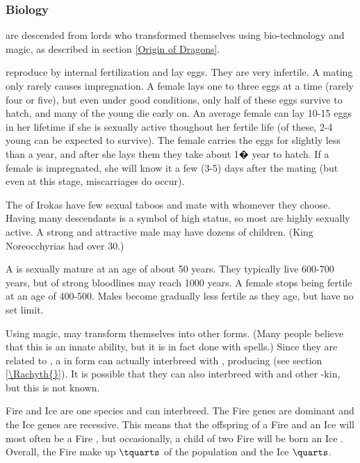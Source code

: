 \subsubsection{Biology}
\Dragons{} are descended from \naga{} lords who transformed themselves using bio-technology and magic, as described in section \ref{Origin of Dragons}. 

\Dragons{} reproduce by internal fertilization and lay eggs. They are very infertile. A mating only rarely causes impregnation. A female lays one to three eggs at a time (rarely four or five), but even under good conditions, only half of these eggs survive to hatch, and many of the young die early on. An average female can lay 10-15 eggs in her lifetime if she is sexually active thoughout her fertile life (of these, 2-4 young can be expected to survive). The female carries the eggs for slightly less than a year, and after she lays them they take about 1� year to hatch. If a female is impregnated, she will know it a few (3-5) days after the mating (but even at this stage, miscarriages do occur).  

The \dragons{} of Irokas have few sexual taboos and mate with whomever they choose. Having many descendants is a symbol of high status, so most \dragons{} are highly sexually active. A strong and attractive male may have dozens of children. (King Noreocchyrias had over 30.) 

A \dragon{} is sexually mature at an age of about 50 years. They typically live 600-700 years, but \dragons{} of strong bloodlines may reach 1000 years. A female stops being fertile at an age of  400-500. Males become gradually less fertile as they age, but have no set limit. 

Using magic, \dragons{} may transform themselves into other forms. (Many people believe that this is an innate ability, but it is in fact done with spells.) Since they are related to \scathae{}, a \dragon{} in \scatha{} form can actually interbreed with \scathae{}, producing \rachyth{} (see section \ref{\Rachyth{}}). It is possible that they can also interbreed with \nagae{} and other \dragon-kin, but this is not known. 

Fire \dragons{} and Ice \dragons{} are one species and can interbreed. The Fire genes are dominant and the Ice genes are recessive. This means that the offspring of a Fire and an Ice \dragon{} will most often be a Fire \dragon{}, but occasionally, a child of two Fire \dragons{} will be born an Ice \dragon{}. Overall, the Fire \dragons{} make up $\tquarts$ of the population and the Ice \dragons{} $\quarts$. 

